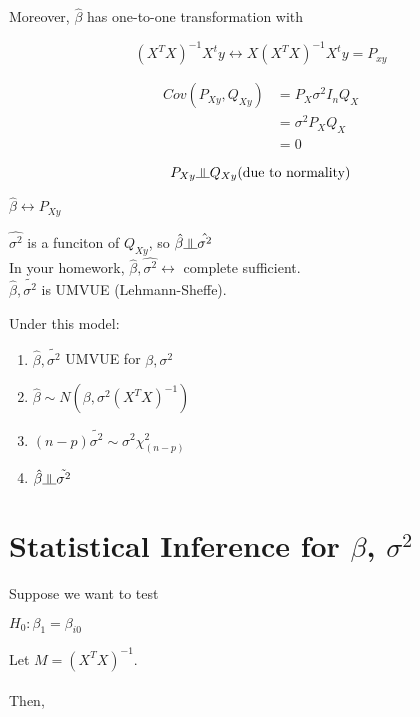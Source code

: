 \documentclass[11pt,fleqn]{book} %
\newcommand{\indep}{\rotatebox[origin=c]{90}{$\models$}}
\begin{document}
	Moreover, $\hat{\beta}$ has one-to-one transformation with 

	$$(X^TX)^{-1} X^t y \leftrightarrow X (X^TX)^{-1} X^t y = P_{xy}$$

	\begin{align*}
		Cov(P_{Xy}, Q_{Xy}) &= P_X \sigma^2 I_n Q_X\\
		&= \sigma^2 P_X Q_X\\
		&= 0
	\end{align*}

	$$P_{Xy} \indep Q_{Xy} \text{(due to normality)} $$

	$\hat{\beta} \leftrightarrow P_{Xy}$

	$\hat{\sigma^2}$ is a funciton of $Q_{Xy}$, so $\hat{\beta} \indep \hat{\sigma^2}$\\

	In your homework, $\hat{\beta}, \hat{\sigma^2} \leftrightarrow$ complete sufficient.\\

	$\hat{\beta}, \tilde{\sigma^2}$ is UMVUE (Lehmann-Sheffe).



\begin{theorem} Under this model:\\

	\begin{enumerate}
		\item $\hat{\beta}, \tilde{\sigma^2}$ UMVUE for $\beta, \sigma^2$
		\item $\hat{\beta} \sim N(\beta, \sigma^2 (X^TX)^{-1})$
		\item $(n-p)\tilde{\sigma^2} \sim \sigma^2 \chi^2_{(n-p)}$
		\item $\hat{\beta} \indep \tilde{\sigma^2}$
	\end{enumerate}

\end{theorem}


\section{Statistical Inference for $\beta$, $\sigma^2$}

Suppose we want to test 

$H_0: \beta_1 = \beta_{i0}$

Let $M = (X^TX)^{-1}$.\\
\\
Then, 
\end{document}
